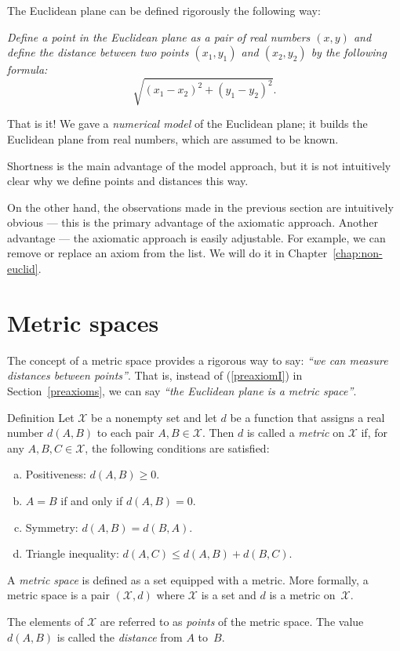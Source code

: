 The Euclidean plane can be defined rigorously the following way:

\textit{Define a {}\emph{point} in the Euclidean plane as a pair of real numbers $(x,y)$ and define the {}\emph{distance} between two points $(x_1,y_1)$ and $(x_2,y_2)$ by the following formula:}
\[\sqrt{(x_1-x_2)^2+(y_1-y_2)^2}.\]

That is it!
We gave a {}\emph{numerical model} of the Euclidean plane;
it builds the Euclidean plane from real numbers, which are assumed to be known.

Shortness is the main advantage of the model approach,
but it is not intuitively clear why we define points and distances this way.

On the other hand, the observations made in the previous section are intuitively obvious ---
this is the primary advantage of the axiomatic approach.
Another advantage --- the axiomatic approach is easily adjustable. 
For example, we can remove or replace an axiom from the list. 
We will do it in Chapter~\ref{chap:non-euclid}.

\section{Metric spaces}\label{sec:Metric spaces}

The concept of a metric space provides 
a rigorous way to say: \textit{``we can measure distances between points''}.
That is, instead of (\ref{preaxiomI}) in Section~\ref{preaxioms},
we can say \textit{``the Euclidean plane is a metric space''}.

\begin{thm}{Definition}\label{def:metric-space}
Let $\mathcal X$ be a nonempty set and 
let $d$ be a function
that assigns a real number $d(A,B)$
to each pair $A,B\in\mathcal X$.
Then $d$ is called a \emph{metric} on 
$\mathcal X$ if, for any
$A,B,C\in \mathcal X$, the following conditions are satisfied:
\begin{enumerate}[(a)]
\item\label{def:metric-space:a} Positiveness: 
$d(A,B)\ge 0.$
\item\label{def:metric-space:b} $A=B$ if and only if 
$d(A,B)=0.$
\item\label{def:metric-space:c} Symmetry: $d(A, B) = d(B, A).$
\item\label{def:metric-space:d} Triangle inequality: 
$d(A, C) \le d(A, B) + d(B, C).$
\end{enumerate}
A \emph{metric space} is defined as a set equipped with a metric. 
More formally, a metric space is a pair $(\mathcal X, d)$ where $\mathcal X$ is a set and $d$ is a metric on~$\mathcal X$.

The elements of $\mathcal X$ are referred to as \emph{points} of the metric space.
The value $d(A, B)$ is called the \emph{distance} from $A$ to~$B$.
\end{thm}

